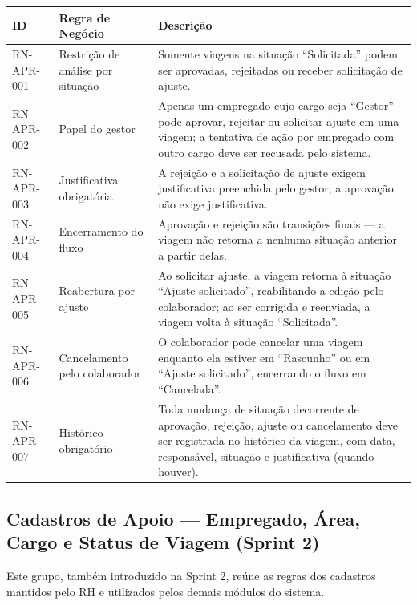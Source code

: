 \documentclass[12pt,article,oneside,a4paper]{abntex2}
\begin{document}
\begin{xltabular}{\textwidth}{|l|l|Y|}
\hline
{}
\textbf{ID} & \textbf{Regra de Negócio} & \textbf{Descrição} \\
\hline
\endhead
RN-APR-001 & Restrição de análise por situação & Somente viagens na situação ``Solicitada'' podem ser aprovadas, rejeitadas ou receber solicitação de ajuste. \\
\hline
RN-APR-002 & Papel do gestor & Apenas um empregado cujo cargo seja ``Gestor'' pode aprovar, rejeitar ou solicitar ajuste em uma viagem; a tentativa de ação por empregado com outro cargo deve ser recusada pelo sistema. \\
\hline
RN-APR-003 & Justificativa obrigatória & A rejeição e a solicitação de ajuste exigem justificativa preenchida pelo gestor; a aprovação não exige justificativa. \\
\hline
RN-APR-004 & Encerramento do fluxo & Aprovação e rejeição são transições finais --- a viagem não retorna a nenhuma situação anterior a partir delas. \\
\hline
RN-APR-005 & Reabertura por ajuste & Ao solicitar ajuste, a viagem retorna à situação ``Ajuste solicitado'', reabilitando a edição pelo colaborador; ao ser corrigida e reenviada, a viagem volta à situação ``Solicitada''. \\
\hline
RN-APR-006 & Cancelamento pelo colaborador & O colaborador pode cancelar uma viagem enquanto ela estiver em ``Rascunho'' ou em ``Ajuste solicitado'', encerrando o fluxo em ``Cancelada''. \\
\hline
RN-APR-007 & Histórico obrigatório & Toda mudança de situação decorrente de aprovação, rejeição, ajuste ou cancelamento deve ser registrada no histórico da viagem, com data, responsável, situação e justificativa (quando houver). \\
\hline
\end{xltabular}

\bigskip

\subsection{Cadastros de Apoio --- Empregado, Área, Cargo e Status de Viagem (Sprint 2)}

Este grupo, também introduzido na Sprint 2, reúne as regras dos cadastros
mantidos pelo RH e utilizados pelos demais módulos do sistema.
\end{document}
